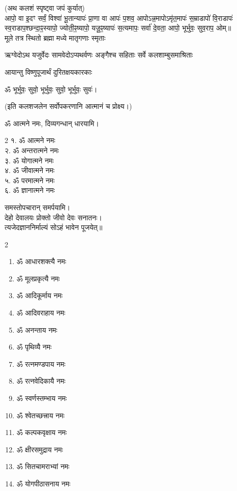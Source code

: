 (अथ कलशं स्पृष्ट्वा जपं कुर्यात्) \\
आपो॒ वा इ॒दꣳ सर्वं॒ विश्वा॑ भू॒तान्यापः॑ प्रा॒णा वा आपः॑ प॒शव॒ आपो\-ऽन्न॒मापोऽमृ॑त॒मापः॑ स॒म्राडापो॑ वि॒राडापः॑ स्व॒राडाप॒श्\-छन्दा॒ꣴ॒स्यापो॒ ज्योती॒ꣴ॒ष्यापो॒ यजू॒ꣴ॒ष्यापः॑ स॒त्यमापः॒ सर्वा॑ दे॒वता॒ आपो॒ भूर्भुवः॒ सुव॒राप॒ ओम्॥\\

{मूले तत्र स्थितो ब्रह्मा मध्ये मातृगणाः स्मृताः}

{ऋग्वेदोऽथ यजुर्वेदः सामवेदोऽप्यथर्वणः}
{अङ्गैश्च सहिताः सर्वे कलशाम्बुसमाश्रिताः}

{आयान्तु विष्णुपूजार्थं दुरितक्षयकारकाः}

\centerline{ॐ भूर्भुवः॒ सुवो॒ भूर्भुवः॒ सुवो॒ भूर्भुवः॒ सुवः॑।}

(इति कलशजलेन सर्वोपकरणानि आत्मानं च प्रोक्ष्य।)

ॐ आत्मने नमः, दिव्यगन्धान् धारयामि।
\begin{multicols}{2}
१. ॐ आत्मने नमः\\
२. ॐ अन्तरात्मने नमः\\
३. ॐ योगात्मने नमः\\
४. ॐ जीवात्मने नमः\\
५. ॐ परमात्मने नमः\\
६. ॐ ज्ञानात्मने नमः
\end{multicols}
समस्तोपचारान् समर्पयामि।\\

देहो देवालयः प्रोक्तो जीवो देवः सनातनः।\\
त्यजेदज्ञाननिर्माल्यं सोऽहं भावेन पूजयेत्॥\\

\begin{multicols}{2}
\begin{enumerate}
\item ॐ आधारशक्त्यै नमः
\item ॐ मूलप्रकृत्यै नमः
\item ॐ आदिकूर्माय नमः
\item ॐ आदिवराहाय नमः
\item ॐ अनन्ताय नमः
\item ॐ पृथिव्यै नमः
\item ॐ रत्नमण्डपाय नमः
\item ॐ रत्नवेदिकायै नमः
\item ॐ स्वर्णस्तम्भाय नमः
\item ॐ श्वेतच्छत्त्राय नमः
\item ॐ कल्पकवृक्षाय नमः
\item ॐ क्षीरसमुद्राय नमः
\item ॐ सितचामराभ्यां नमः
\item ॐ योगपीठासनाय नमः
\end{enumerate}
\end{multicols}

